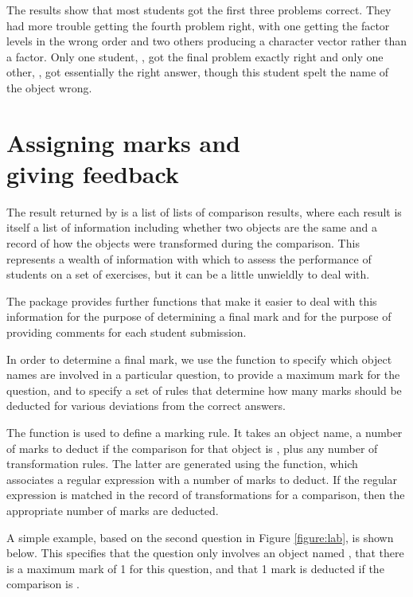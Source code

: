 The results show that most students got the first three problems 
correct.  They had more trouble getting the fourth problem right,
with one getting the factor levels in the wrong order and two others
producing a character vector rather than a factor.  Only one student,
,
got the final problem exactly right and only one other, 
, got essentially
the right answer, though this student spelt the name of the object
wrong.  

\section*{Assigning marks and\\giving feedback}

The result returned by  is a list of lists of 
comparison results, where each result is itself a list of information
including whether two objects are the same and a record of 
how the objects were 
transformed during the comparison.  This represents a wealth 
of information with which to assess the performance of students
on a set of \R{} exercises, but it can be a little unwieldly to deal with.

The  package provides further functions that make it easier
to deal with this information for the purpose of determining a final mark
and for the purpose of providing comments
for each student submission.

In order to determine a final mark, we use the  function
to specify which object names are involved in a particular question,
to provide a maximum mark for the question, and to
specify a set of rules that determine how many marks should be deducted for
various deviations from the correct answers.
  
The  function is used
to define a marking rule.  It takes an object name, a number of marks
to deduct if the comparison for that object is , 
plus any number of 
transformation rules.  The latter are
 generated using the  function, which
associates a regular expression with a number of
marks to deduct.  If the regular expression is matched in the record of 
transformations for a comparison, 
then the appropriate number of marks are deducted.  

A simple example, based on the second question in Figure
\ref{figure:lab}, is shown below.  This specifies that the question only
involves an object named , that there is a maximum
mark of 1 for this question, and that 1 mark is deducted if the 
comparison is .

